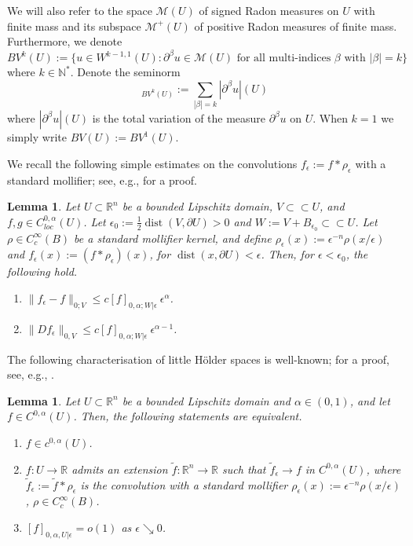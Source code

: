 \documentclass[12pt]{article}
\newcommand{\R}{\mathbb{R}}
\newcommand{\dist}{\operatorname{dist}}
\theoremstyle{plain}
\newtheorem{lemma}[theorem]{Lemma}
\numberwithin{equation}{section}
\begin{document}
    We will also refer to the space $\mathcal{M}(U)$ of signed Radon measures on $U$ with finite mass and its subspace $\mathcal{M}^+(U)$ of positive Radon measures of finite mass. Furthermore, we denote
    \begin{equation*}
        BV^k(U) := \{u \in W^{k-1,1}(U): \partial^\beta u \in \mathcal{M}(U) \text{ for all multi-indices } \beta \text{ with } |\beta| = k \}
    \end{equation*}
    where $k \in \mathbb{N}^*$. Denote the seminorm
    \begin{equation*}
        [u]_{BV^k(U)} := \sum_{|\beta| = k} |\partial^\beta u|(U)
    \end{equation*}
    where $|\partial^\beta u|(U)$ is the total variation of the measure $\partial^\beta u$ on $U$. When $k=1$ we simply write $BV(U) := BV^1(U)$. 
    
    We recall the following simple estimates on the convolutions $f_\epsilon := f *\rho_\epsilon$ with a standard mollifier; see, e.g., \cite[Lemma 1]{conti_deLellis_szekelyhidi_12} for a proof.
    \begin{lemma} \label{lemma:c0alpha_convolution}
        Let $U \subset \R^n$ be a bounded Lipschitz domain, $V \subset\subset U$, and $f,g \in C^{0,\alpha}_{loc}(U)$. Let $\epsilon_0 :=\frac12\operatorname{dist}(V,\partial U) > 0$ and $W := V + B_{\epsilon_0} \subset\subset U$. Let $\rho \in C^\infty_c(B)$ be a standard mollifier kernel, and define $\rho_\epsilon(x):= \epsilon^{-n}\rho(x/\epsilon)$ and $f_\epsilon(x) := (f * \rho_\epsilon)(x)$, for $\dist(x,\partial U) < \epsilon$. Then, for $\epsilon < \epsilon_0$, the following hold.
        \begin{enumerate}
            \item[(i)] $\|f_\epsilon - f\|_{0;V} \leq c[f]_{0,\alpha;W|\epsilon} ~ \epsilon^\alpha$.
            \item[(ii)] $\|Df_\epsilon\|_{0,V} \leq c[f]_{0,\alpha;W|\epsilon}~\epsilon^{\alpha-1}$.
        \end{enumerate}
    \end{lemma}

    The following characterisation of little Hölder spaces is well-known; for a proof, see, e.g., \cite[Proposition 3.4]{deLellis_pakzad_21}.
    \begin{lemma}  \label{lemma:c0alpha_equivalence}
        Let $U \subset \R^n$ be a bounded Lipschitz domain and $\alpha \in (0,1)$, and let $f \in C^{0,\alpha}(U)$. Then, the following statements are equivalent.
        \begin{enumerate}
            \item[(i)] $f \in c^{0,\alpha}(U)$.
            \item[(ii)] $f: U \to \R$ admits an extension $\tilde{f}: \R^n \to \R$ such that $\tilde{f}_\epsilon \to f$ in $C^{0,\alpha}(U)$, where $\tilde{f}_\epsilon := \tilde{f} * \rho_\epsilon$ is the convolution with a standard mollifier $\rho_\epsilon(x) := \epsilon^{-n} \rho(x/\epsilon)$, $\rho \in C^\infty_c(B)$.
            \item[(iii)] $[f]_{0,\alpha,U|\epsilon} = o(1)$ as $\epsilon \searrow 0$.
        \end{enumerate}
    \end{lemma}
\end{document}
